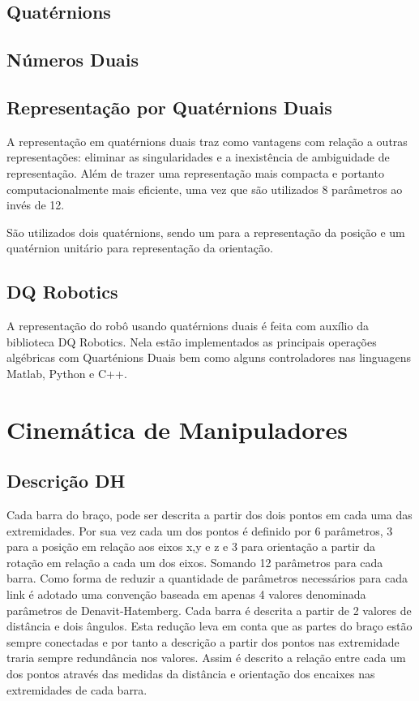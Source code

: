\subsection{Quatérnions}
%
\subsection{Números Duais}

\subsection{Representação por Quatérnions Duais}


A representação em quatérnions duais traz como vantagens com relação a outras representações: eliminar as singularidades e a inexistência de ambiguidade de representação. Além de trazer uma representação mais compacta e portanto computacionalmente mais eficiente, uma vez que são utilizados 8 parâmetros ao invés de 12. %

São utilizados dois quatérnions, sendo um para a representação da posição e um quatérnion unitário para representação da orientação.

\subsection{DQ Robotics}

A representação do robô usando quatérnions duais é feita com auxílio da biblioteca DQ Robotics. Nela estão implementados as principais operações algébricas com Quarténions Duais bem como alguns controladores nas linguagens Matlab, Python e C++.

\section{Cinemática de Manipuladores}

\subsection{Descrição DH}

Cada barra do braço, pode ser descrita a partir dos dois pontos em cada uma das extremidades. Por sua vez cada um dos pontos é definido por 6 parâmetros, 3 para a posição em relação aos eixos x,y e z e 3 para orientação a partir da rotação em relação a cada um dos eixos. Somando 12 parâmetros para cada barra. Como forma de reduzir a quantidade de parâmetros necessários para cada link é adotado uma convenção baseada em apenas 4 valores denominada parâmetros de Denavit-Hatemberg. Cada barra é descrita a partir de 2 valores de distância e dois ângulos. Esta redução leva em conta que as partes do braço estão sempre conectadas e por tanto a descrição a partir dos pontos nas extremidade traria sempre redundância nos valores. Assim é descrito a relação entre cada um dos pontos através das medidas da distância e orientação dos encaixes nas extremidades de cada barra.

